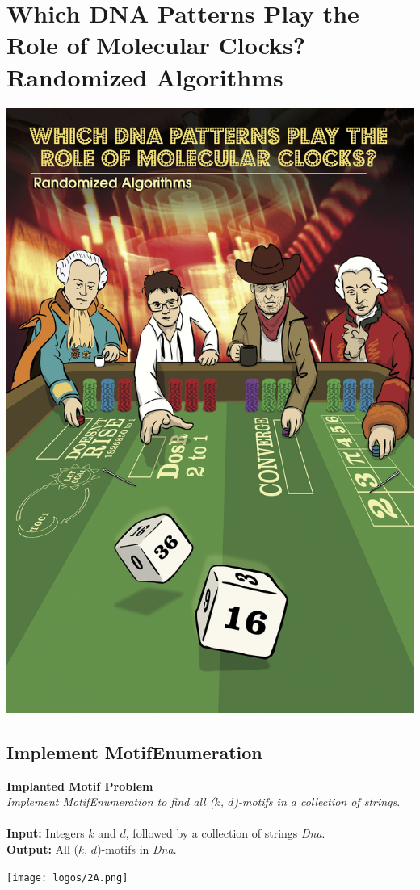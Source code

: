 \documentclass{article}
\begin{document}
\section{Which DNA Patterns Play the Role of Molecular Clocks?\\ Randomized Algorithms}
\begin{center}
    \includegraphics[scale=0.72]{c2.jpg}
\end{center}
\pagebreak

\subsection{Implement MotifEnumeration}
\hline\vspace{5}
\noindent\textbf{Implanted Motif Problem}\\
\emph{Implement MotifEnumeration to find all ($k$, $d$)-motifs in a collection of strings}.\\ \\
\textbf{Input:} Integers $k$ and $d$, followed by a collection of strings \emph{Dna}.\\
\textbf{Output:} All ($k$, $d$)-motifs in \emph{Dna}.
\begin{center}
    \texttt{[image: logos/2A.png]} 
\end{center}
\hline\vspace{5}
\end{document}
